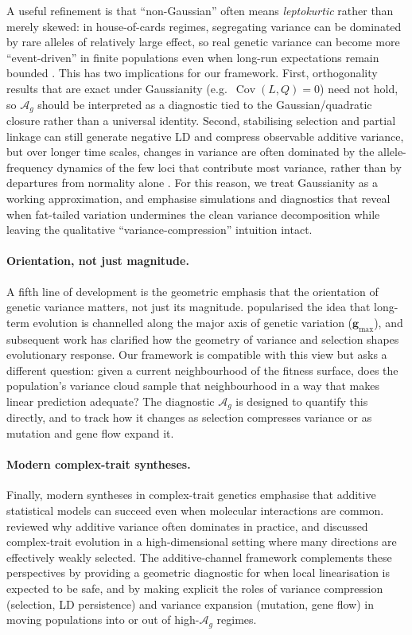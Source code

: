 \documentclass[9pt,twocolumn,twoside,lineno]{gsajnl}
\newcommand{\vect}[1]{\boldsymbol{#1}}
\newcommand{\Ag}{\ensuremath{\mathcal{A}_{g}}\xspace}
\newcommand{\Cov}{\ensuremath{\operatorname{Cov}}\xspace}
\begin{document}
A useful refinement is that ``non-Gaussian'' often means \emph{leptokurtic} rather than merely skewed: in house-of-cards regimes, segregating variance can be dominated by rare alleles of relatively large effect, so real genetic variance can become more ``event-driven'' in finite populations even when long-run expectations remain bounded \citep{Turelli1984,KeightleyHill1988,JohnsonBarton2005}. This has two implications for our framework. First, orthogonality results that are exact under Gaussianity (e.g.\ $\Cov(L,Q)=0$) need not hold, so \Ag should be interpreted as a diagnostic tied to the Gaussian/quadratic closure rather 
than a universal identity. Second, stabilising selection and partial linkage can still generate negative LD and compress observable additive variance, but over longer time scales, changes in variance are often dominated by the allele-frequency dynamics of the few loci that contribute most variance, rather than by departures from normality alone \citep{TurelliBarton1994}. For this 
reason, we treat Gaussianity as a working approximation, and emphasise simulations and diagnostics that reveal when fat-tailed variation undermines the clean variance decomposition while leaving the qualitative ``variance-compression'' intuition intact.

\paragraph{Orientation, not just magnitude.}
A fifth line of development is the geometric emphasis that the orientation of genetic variance matters, not just its magnitude. \citet{Schluter1996} popularised the idea that long-term evolution is channelled along the major axis of genetic variation ($\vect{g}_{\max}$), and subsequent work has clarified how the geometry of variance and selection shapes evolutionary response. Our framework is compatible with this view but asks a different question: given a current neighbourhood of the fitness surface, does the population's variance cloud sample that neighbourhood in a way that makes linear prediction adequate? The diagnostic \Ag is designed to quantify this directly, and to track how it changes as selection compresses variance or as mutation and gene flow expand it.

\paragraph{Modern complex-trait syntheses.}
Finally, modern syntheses in complex-trait genetics emphasise that additive statistical models can succeed even when molecular interactions are common. \citet{HillGoddardVisscher2008} reviewed why additive variance often dominates in practice, and \citet{SellaBarton2019} discussed complex-trait evolution in a high-dimensional setting where many directions are effectively weakly selected.  The additive-channel framework complements these perspectives by providing a geometric diagnostic for when local linearisation is expected to be safe, and by making explicit the roles of variance compression (selection, LD persistence) and variance expansion (mutation, gene flow) in moving populations into or out of high-\Ag regimes.
\end{document}

